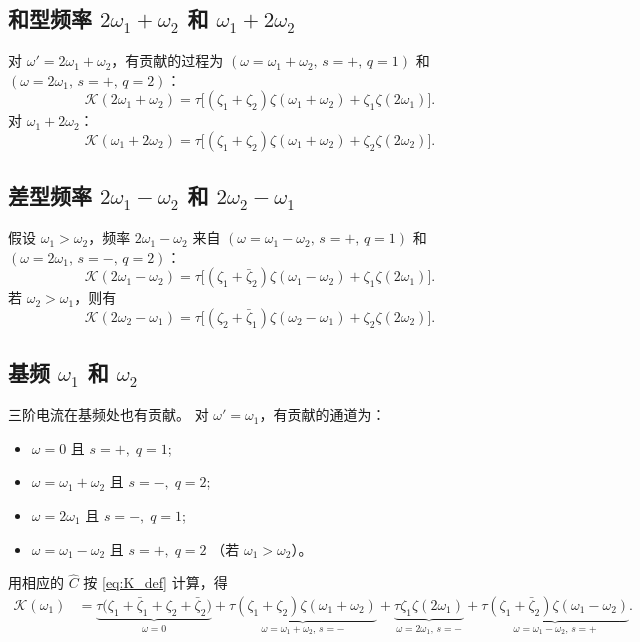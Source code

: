 \subsection{和型频率 \(2\omega_1+\omega_2\) 和 \(\omega_1+2\omega_2\)}
对 \(\omega' = 2\omega_1+\omega_2\)，有贡献的过程为 \((\omega=\omega_1+\omega_2,\,s=+,\,q=1)\) 和 \((\omega=2\omega_1,\,s=+,\,q=2)\)：
\begin{equation}
\mathcal{K}(2\omega_1+\omega_2) = \tau\Big[ (\zeta_1+\zeta_2)\zeta(\omega_1+\omega_2) + \zeta_1\zeta(2\omega_1) \Big].
\label{eq:K_2w1+w2}
\end{equation}
对 \(\omega_1+2\omega_2\)：
\begin{equation}
\mathcal{K}(\omega_1+2\omega_2) = \tau\Big[ (\zeta_1+\zeta_2)\zeta(\omega_1+\omega_2) + \zeta_2\zeta(2\omega_2) \Big].
\label{eq:K_w1+2w2}
\end{equation}

\subsection{差型频率 \(2\omega_1-\omega_2\) 和 \(2\omega_2-\omega_1\)}
假设 \(\omega_1>\omega_2\)，频率 \(2\omega_1-\omega_2\) 来自 \((\omega=\omega_1-\omega_2,\,s=+,\,q=1)\) 和 \((\omega=2\omega_1,\,s=-,\,q=2)\)：
\begin{equation}
\mathcal{K}(2\omega_1-\omega_2) = \tau\Big[ (\zeta_1+\bar\zeta_2)\zeta(\omega_1-\omega_2) + \zeta_1\zeta(2\omega_1) \Big].
\label{eq:K_2w1-w2}
\end{equation}
若 \(\omega_2>\omega_1\)，则有
\begin{equation}
\mathcal{K}(2\omega_2-\omega_1) = \tau\Big[ (\zeta_2+\bar\zeta_1)\zeta(\omega_2-\omega_1) + \zeta_2\zeta(2\omega_2) \Big].
\label{eq:K_2w2-w1}
\end{equation}

\subsection{基频 \(\omega_1\) 和 \(\omega_2\)}
三阶电流在基频处也有贡献。
对 \(\omega'=\omega_1\)，有贡献的通道为：
\begin{itemize}
\item \(\omega=0\) 且 \(s=+,\;q=1\);
\item \(\omega=\omega_1+\omega_2\) 且 \(s=-,\;q=2\);
\item \(\omega=2\omega_1\) 且 \(s=-,\;q=1\);
\item \(\omega=\omega_1-\omega_2\) 且 \(s=+,\;q=2\) （若 \(\omega_1>\omega_2\)）。
\end{itemize}
用相应的 \(\hat C\) 按 \eqref{eq:K_def} 计算，得
\begin{align}
\mathcal{K}(\omega_1) &=
\underbrace{\tau\big(\zeta_1+\bar\zeta_1+\zeta_2+\bar\zeta_2\big)}_{\omega=0}
+ \underbrace{\tau(\zeta_1+\zeta_2)\zeta(\omega_1+\omega_2)}_{\omega=\omega_1+\omega_2,\,s=-}
+ \underbrace{\tau\zeta_1\zeta(2\omega_1)}_{\omega=2\omega_1,\,s=-}
+ \underbrace{\tau(\zeta_1+\bar\zeta_2)\zeta(\omega_1-\omega_2)}_{\omega=\omega_1-\omega_2,\,s=+}.
\label{eq:K_w1}
\end{align}

